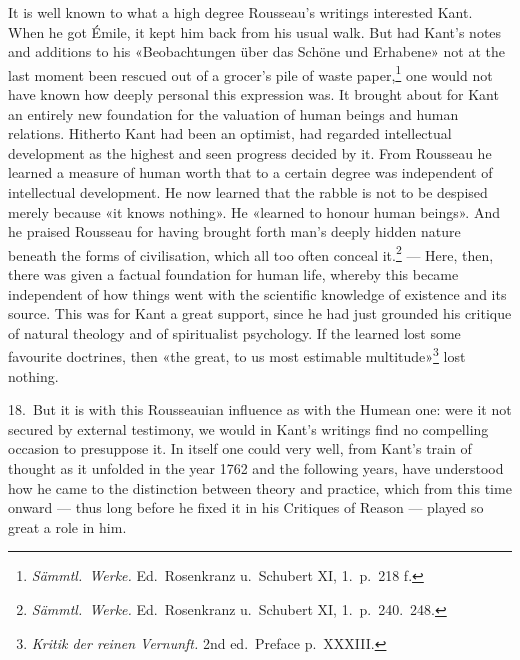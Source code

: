 \documentclass[12pt,a4paper]{article}
\newcommand{\opage}[1]{\marginnote{\footnotesize\textit{[#1]}}}
\begin{document}
It is well known to what a high degree Rousseau's writings interested Kant.
When he got Émile, it kept him back from his usual walk. But had Kant's
notes and additions to his «Beobachtungen über das Schöne und Erhabene»
not at the last moment been rescued out of a grocer's pile of waste
paper,\footnote{\textit{Sämmtl.\ Werke.} Ed.\ Rosenkranz u.\ Schubert XI,
1.\ p.\ 218 f.} one would not have known how deeply personal this
expression was. It brought about for Kant an entirely new foundation for
the valuation of human beings and human relations. Hitherto Kant had been
an optimist, had regarded intellectual development as the highest and seen
progress decided by it. From Rousseau he learned a measure of human worth
that to a certain degree was independent of intellectual development. He
now learned that the rabble is not to be despised merely because «it knows
nothing». He «learned to honour human beings». And he praised \opage{37}Rousseau for
having brought forth man's deeply hidden nature beneath the forms of
civilisation, which all too often conceal it.\footnote{\textit{Sämmtl.\
Werke.} Ed.\ Rosenkranz u.\ Schubert XI, 1.\ p.\ 240.\ 248.} --- Here,
then, there was given a factual foundation for human life, whereby this
became independent of how things went with the scientific knowledge of
existence and its source. This was for Kant a great support, since he had
just grounded his critique of natural theology and of spiritualist
psychology. If the learned lost some favourite doctrines, then «the great,
to us most estimable multitude»\footnote{\textit{Kritik der reinen
Vernunft.} 2nd ed.\ Preface p.\ XXXIII.} lost nothing.

18.\ But it is with this Rousseauian influence as with the Humean one: were
it not secured by external testimony, we would in Kant's writings find no
compelling occasion to presuppose it. In itself one could very well, from
Kant's train of thought as it unfolded in the year 1762 and the following
years, have understood how he came to the distinction between theory and
practice, which from this time onward --- thus long before he fixed it in
his Critiques of Reason --- played so great a role in him.
\end{document}
